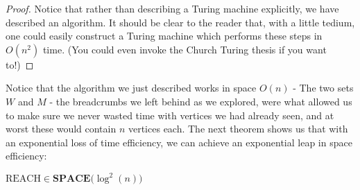 \begin{proof}
\par Notice that rather than describing a Turing machine explicitly, we have described an algorithm. It should be clear to the reader that, with a little tedium, one could easily construct a Turing machine which performs these steps in $O(n^2)$ time. (You could even invoke the Church Turing thesis if you want to!)
\end{proof}
Notice that the algorithm we just described works in space $O(n)$ - The two sets $W$ and $M$ - the breadcrumbs we left behind as we explored, were what allowed us to make sure we never wasted time with vertices we had already seen, and at worst these would contain $n$ vertices each. The next theorem shows us that with an exponential loss of time efficiency, we can achieve an exponential leap in space efficiency:
\begin{theorem}
    $\textrm{REACH} \in \textbf{SPACE($\log^2(n)$)}$
\end{theorem}
